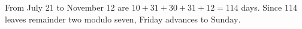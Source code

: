 From July 21 to November 12 are $10+31+30+31+12=114$ days. Since 114 leaves remainder two modulo seven, Friday advances to $\boxed{\text{Sunday}}$.
